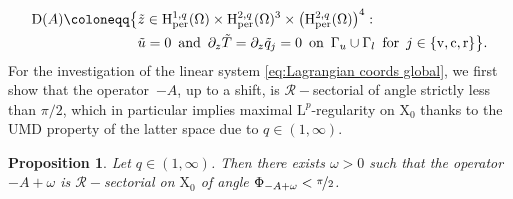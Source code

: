 \documentclass[10pt]{amsart}
\theoremstyle{plain}
\newtheorem{prop}[prop]{Proposition}
\theoremstyle{definition}
\theoremstyle{thm}
\numberwithin{equation}{section}
\newcommand{\rL}{\mathrm{L}}
\newcommand{\rLp}{\rL^p}
\newcommand{\rD}{\mathrm{D}}
\newcommand{\rH}{\mathrm{H}}
\newcommand{\rX}{\mathrm{X}}
\newcommand{\del}{\partial}
\newcommand{\per}{\mathrm{per}}
\newcommand{\dz}{\del_z}
\newcommand{\Gal}{\Gamma_l}
\newcommand{\Gau}{\Gamma_u}
\newcommand{\tand}{\enspace \text{and} \enspace}
\newcommand{\ton}{\enspace \text{on} \enspace}
\newcommand{\tfor}{\enspace \text{for} \enspace}
\newcommand{\rr}{\mathrm{r}}
\newcommand{\rv}{\mathrm{v}}
\newcommand{\rc}{\mathrm{c}}
\newcommand{\tu}{\Tilde{u}}
\newcommand{\tz}{\Tilde{z}}
\newcommand{\tT}{\Tilde{T}}
\newcommand{\tq}{\Tilde{q}}
\begin{document}
\begin{equation*}
    \begin{aligned}
        \rD(A) \coloneqq \bigl\{&\tz \in \rH^{1,q}_\per(\Omega) \times \rH^{2,q}_\per(\Omega)^3 \times \bigl ( \rH_\per^{2,q}(\Omega) \bigr )^4 :\\
        &\tu = 0 \tand \dz \tT = \dz \tq_j =0 \ton \Gau \cup \Gal \tfor j \in \{\rv,\rc,\rr\} \bigr \}.
    \end{aligned}
\end{equation*}
For the investigation of the linear system \eqref{eq:Lagrangian coords global}, we first show that the operator~$-A$, up to a shift, is $\mathcal{R}-$sectorial of angle strictly less than $\pi/2$, which in particular implies maximal $\rLp$-regularity on $\rX_0$ thanks to the UMD property of the latter space due to $q \in (1,\infty)$.

\begin{prop}
    \label{prop: max reg A}
    Let $q \in (1,\infty)$. Then there exists $\omega>0$ such that the operator~$-A+\omega$ is $\mathcal{R}-$sectorial on $\rX_0$ of angle $\Phi_{-A+\omega} < \nicefrac{\pi}{2}$.
\end{prop}
\end{document}
